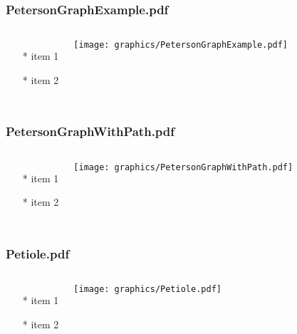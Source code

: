 \documentclass{beamer}
\begin{document}
\begin{frame} \frametitle{PetersonGraphExample.pdf}
    \begin{columns}[c]
        \begin{itemize}
            \item[*] item 1
            \item[*] item 2
        \end{itemize}
        \begin{minipage}{\linewidth}
            \begin{center}
            \texttt{[image: graphics/PetersonGraphExample.pdf]}
            \label{gfx:PetersonGraphExample.pdf}
            \end{center}
        \end{minipage}
    \end{columns}
\end{frame}
\begin{frame} \frametitle{PetersonGraphWithPath.pdf}
    \begin{columns}[c]
        \begin{itemize}
            \item[*] item 1
            \item[*] item 2
        \end{itemize}
        \begin{minipage}{\linewidth}
            \begin{center}
            \texttt{[image: graphics/PetersonGraphWithPath.pdf]}
            \label{gfx:PetersonGraphWithPath.pdf}
            \end{center}
        \end{minipage}
    \end{columns}
\end{frame}
\begin{frame} \frametitle{Petiole.pdf}
    \begin{columns}[c]
        \begin{itemize}
            \item[*] item 1
            \item[*] item 2
        \end{itemize}
        \begin{minipage}{\linewidth}
            \begin{center}
            \texttt{[image: graphics/Petiole.pdf]}
            \label{gfx:Petiole.pdf}
            \end{center}
        \end{minipage}
    \end{columns}
\end{frame}
\end{document}
